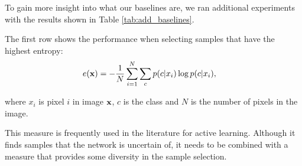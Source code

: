 \documentclass[letterpaper, 10 pt, conference]{ieeeconf}  %
\begin{document}
   
%
   




To gain more insight into what our baselines are, we ran additional experiments with the results shown in Table \ref{tab:add_baselines}. 

The first row shows the performance when selecting samples that have the highest entropy:
\begin{align}
e(\bold{x}) &= -\frac{1}{N} \sum_{i=1}^N \sum_{c} p(c|x_i) \log p(c|x_i),
\end{align}  

where $x_i$ is pixel $i$ in image $\bold{x}$, $c$ is the class and $N$ is the number of pixels in the image.

This measure is frequently used in the literature \cite{chakraborty2015active, zhou2017fine} for active learning. Although it finds samples that the network is uncertain of, it needs to be combined with a measure that provides some diversity in the sample selection. 
\end{document}
